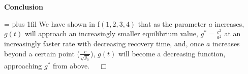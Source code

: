 \documentclass[]{article}
\begin{document}
\noindent \textbf{Conclusion}\newline
{\par\leftskip=\parindent \parindent=0pt \rightskip=0pt plus 1fil
We have shown in f$(1,2,3,4)$ that as the parameter $a$ increases, $g(t)$ will approach an increasingly smaller equilibrium value, $g^* = \frac{c^2}{a^2}$ at an increasingly faster rate with decreasing recovery time, and, once $a$ increases beyond a certain point ($\frac{c}{\sqrt{g_0}}$), $g(t)$ will become a decreasing function, approaching $g^*$ from above. $\quad \Box$\par}

\hrulefill 
\end{document}
